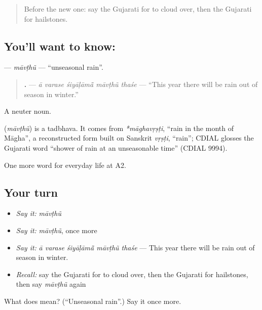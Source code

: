 \label{lesson:GU-C219-mavthu}



\begin{quote}
Before the new one: say the Gujarati for to cloud over, then the Gujarati for hailstones.
\end{quote}

\subsection*{You'll want to know: }
\textbf{} — \emph{māvṭhũ} — \textquotedblleft{}unseasonal rain\textquotedblright{}.

\begin{quote}
\textbf{    .} — \emph{ā varase śiyāḷāmā̃ māvṭhũ thaśe} — \textquotedblleft{}This year there will be rain out of season in winter.\textquotedblright{}
\end{quote}

A neuter noun.

\begin{cousinweb}
\textbf{} (\emph{māvṭhũ}) is a tadbhava. It comes from \emph{*māghavṛṣṭi}, \textquotedblleft{}rain in the month of Māgha\textquotedblright{}, a reconstructed form built on Sanskrit \emph{vṛṣṭi}, \textquotedblleft{}rain\textquotedblright{}; CDIAL glosses the Gujarati word \textquotedblleft{}shower of rain at an unseasonable time\textquotedblright{} (CDIAL 9994).
\end{cousinweb}

\begin{grammarlens}[title={What you've built}]
One more word for everyday life at A2.
\end{grammarlens}

\subsection*{Your turn}
\begin{itemize}
\raggedright
  \item \emph{Say it:} \emph{māvṭhũ}
  \item \emph{Say it:} \emph{māvṭhũ}, once more
  \item \emph{Say it:} \emph{ā varase śiyāḷāmā̃ māvṭhũ thaśe} — This year there will be rain out of season in winter.
  \item \emph{Recall:} say the Gujarati for to cloud over, then the Gujarati for hailstones, then say \emph{māvṭhũ} again
\end{itemize}

\begin{tcolorbox}[breakable,colback=teal!4,colframe=teal!35!black,title={Before you move on}]
What does  mean? (\textquotedblleft{}Unseasonal rain\textquotedblright{}.) Say it once more.
\end{tcolorbox}
